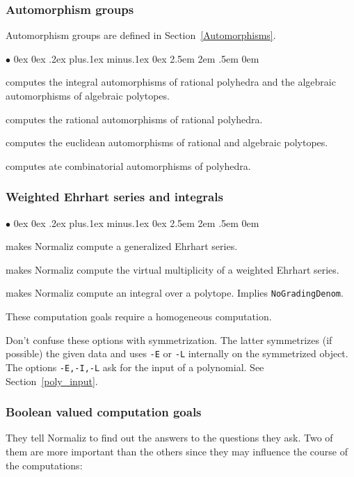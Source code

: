 \documentclass[12pt,a4paper]{scrartcl}
\newcommand{\stdli}{ \topsep0ex \partopsep0ex %
\parsep.2ex plus.1ex minus.1ex \itemsep0ex%
\leftmargin2.5em \labelwidth2em \labelsep.5em \rightmargin0em}%
\renewenvironment{itemize}{\begin{list}{{$\bullet$}}{\stdli}}{\end{list}}
\theoremstyle{definition}
\def\itemtt[#1]{\item[\textbf{\ttt{#1}}]}
\def\ttt{\texttt}
\begin{document}
\subsubsection{Automorphism groups}

Automorphism groups are defined in Section~\ref{Automorphisms}.
\begin{itemize}
	\itemtt[Automorphisms] computes the integral automorphisms of rational polyhedra and the algebraic automorphisms of algebraic polytopes.
	
	\itemtt [RationalAutomorphisms] computes the rational automorphisms of rational polyhedra.
	
	\itemtt[EuclideanAutomorphisms] computes the euclidean automorphisms of rational and algebraic polytopes.
	
	\itemtt [CombinatorialAutomorphisms] computes ate combinatorial automorphisms of polyhedra.
\end{itemize}

\subsubsection{Weighted Ehrhart series and integrals}

\begin{itemize}
	
	\itemtt[WeightedEhrhartSeries, -E] makes Normaliz compute a generalized Ehrhart series.
	
	\itemtt[VirtualMultiplicity, -L] makes Normaliz compute the virtual multiplicity of a weighted Ehrhart series.
	
	\itemtt[Integral, -I] makes Normaliz compute an integral over a polytope. Implies \verb|NoGradingDenom|.
\end{itemize}

These computation goals require a homogeneous computation.

Don't confuse these options with symmetrization. The latter symmetrizes (if possible) the given data and uses \verb|-E| or \verb|-L| internally on the symmetrized object. The options \verb|-E,-I,-L| ask for the input of a polynomial. See Section~\ref{poly_input}.

\subsubsection{Boolean valued computation goals}\label{bool}

They tell Normaliz to find out the answers to the questions they ask. Two of them are more important than the others since they may influence the course of the computations:
\end{document}
